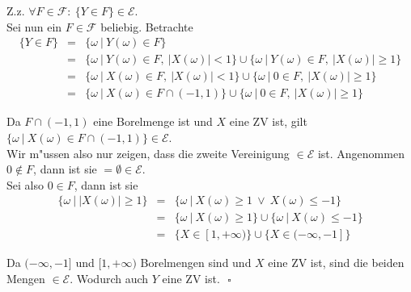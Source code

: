 \documentclass[11pt,a4paper,ngerman]{article}
\newcommand{\set}[1]{ \{ #1 \}}
\newcommand{\abs}[1]{ |#1|}
\newcommand{\solved}{$\mbox{}$ \hfill $\square$}
\newcommand{\Epsilon}{\mathcal{E}}
\begin{document}
Z.z. $\forall F \in \mathcal{F}:\ \set{Y \in F} \in \Epsilon$. \\

Sei nun ein $F \in \mathcal{F}$ beliebig.
Betrachte
\begin{eqnarray}
  \set{Y \in F} &=& \set{\omega\ |\ Y(\omega) \in F} \\
  &=& \set{\omega\ |\ Y(\omega) \in F,\ \abs{X(\omega)} < 1} \cup
      \set{\omega\ |\ Y(\omega) \in F,\ \abs{X(\omega)} \ge 1} \\
  &=& \set{\omega\ |\ X(\omega) \in F,\ \abs{X(\omega)} < 1} \cup
      \set{\omega\ |\ 0 \in F,\ \abs{X(\omega)} \ge 1} \\
  &=& \set{\omega\ |\ X(\omega) \in F\cap(-1, 1)} \cup
      \set{\omega\ |\ 0 \in F,\ \abs{X(\omega)} \ge 1}
\end{eqnarray}

Da $F\cap(-1, 1)$ eine Borelmenge ist und $X$ eine ZV ist, gilt
$\set{\omega\ |\ X(\omega) \in F\cap(-1, 1)} \in \Epsilon$. \\

Wir m"ussen also nur zeigen, dass die zweite Vereinigung $\in \Epsilon$ ist.
Angenommen $0 \not\in F$, dann ist sie $ = \emptyset \in \Epsilon$. \\

Sei also $0 \in F$, dann ist sie
\begin{eqnarray}
  \set{\omega\ |\ \abs{X(\omega)} \ge 1} &=& 
  \set{\omega\ |\ X(\omega) \ge 1\ \lor\ X(\omega) \le -1} \\
  &=& \set{\omega\ |\ X(\omega) \ge 1} \cup \set{\omega\ |\ X(\omega) \le -1} \\
  &=& \set{X \in [1, +\infty)} \cup \set{X \in (-\infty, -1]}
\end{eqnarray}

Da $(-\infty, -1]$ und $[1, +\infty)$ Borelmengen sind und $X$ eine ZV ist,
sind die beiden Mengen $\in \Epsilon$. Wodurch auch $Y$ eine ZV ist. \solved

\label{LastPage}
\end{document}
